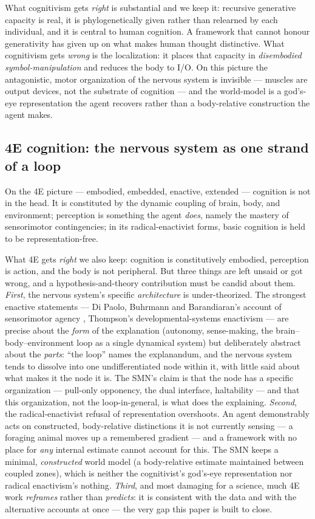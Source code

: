 \documentclass[utf8]{FrontiersinHarvard} %
\begin{document}
What cognitivism gets \emph{right} is substantial and we keep it: recursive generative capacity is real, it is phylogenetically given rather than relearned by each individual, and it is central to human cognition. A framework that cannot honour generativity has given up on what makes human thought distinctive. What cognitivism gets \emph{wrong} is the localization: it places that capacity in \emph{disembodied symbol-manipulation} and reduces the body to I/O. On this picture the antagonistic, motor organization of the nervous system is invisible --- muscles are output devices, not the substrate of cognition --- and the world-model is a god's-eye representation the agent recovers rather than a body-relative construction the agent makes.

\subsection{4E cognition: the nervous system as one strand of a loop}\label{sec:4e}

On the 4E picture --- embodied, embedded, enactive, extended --- cognition is not in the head. It is constituted by the dynamic coupling of brain, body, and environment; perception is something the agent \emph{does}, namely the mastery of sensorimotor contingencies; in its radical-enactivist forms, basic cognition is held to be representation-free.

What 4E gets \emph{right} we also keep: cognition is constitutively embodied, perception is action, and the body is not peripheral. But three things are left unsaid or got wrong, and a hypothesis-and-theory contribution must be candid about them. \emph{First}, the nervous system's specific \emph{architecture} is under-theorized. The strongest enactive statements --- Di Paolo, Buhrmann and Barandiaran's account of sensorimotor agency \citep{DiPaolo2017SensorimotorLife}, Thompson's developmental-systems enactivism \citep{Thompson2007MindInLife} --- are precise about the \emph{form} of the explanation (autonomy, sense-making, the brain--body--environment loop as a single dynamical system) but deliberately abstract about the \emph{parts}: ``the loop'' names the explanandum, and the nervous system tends to dissolve into one undifferentiated node within it, with little said about what makes it the node it is. The SMN's claim is that the node has a specific organization --- pull-only opponency, the dual interface, haltability --- and that this organization, not the loop-in-general, is what does the explaining. \emph{Second}, the radical-enactivist refusal of representation \citep{hutto2017} overshoots. An agent demonstrably acts on constructed, body-relative distinctions it is not currently sensing --- a foraging animal moves up a remembered gradient --- and a framework with no place for \emph{any} internal estimate cannot account for this. The SMN keeps a minimal, \emph{constructed} world model (a body-relative estimate maintained between coupled zones), which is neither the cognitivist's god's-eye representation nor radical enactivism's nothing. \emph{Third}, and most damaging for a science, much 4E work \emph{reframes} rather than \emph{predicts}: it is consistent with the data and with the alternative accounts at once --- the very gap this paper is built to close.
\end{document}
